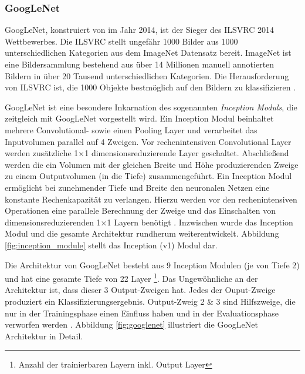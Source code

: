 \subsubsection{GoogLeNet}
\label{sec:googlenet}
GoogLeNet, konstruiert von \citet{szegedyGoingDeeperConvolutions2015} im Jahr 2014, ist der Sieger des ILSVRC 2014 Wettbewerbes. Die ILSVRC stellt ungefähr 1000 Bilder aus 1000 unterschiedlichen Kategorien aus dem ImageNet Datensatz bereit. ImageNet ist eine Bildersammlung bestehend aus über 14 Millionen manuell annotierten Bildern in über 20 Tausend unterschiedlichen Kategorien. Die Herausforderung von ILSVRC ist, die 1000 Objekte bestmöglich auf den Bildern zu klassifizieren \cite{russakovskyImageNetLargeScale2015}.

GoogLeNet ist eine besondere Inkarnation des sogenannten \textit{Inception Moduls}, die zeitgleich mit GoogLeNet vorgestellt wird.
Ein Inception Modul beinhaltet mehrere Convolutional- sowie einen Pooling Layer und verarbeitet das Inputvolumen parallel auf 4 Zweigen. Vor rechenintensiven Convolutional Layer werden zusätzliche 1$\times$1 dimensionsreduzierende Layer geschaltet. Abschließend werden die ein Volumen mit der gleichen Breite und Höhe produzierenden Zweige zu einem Outputvolumen (in die Tiefe) zusammengeführt. Ein Inception Modul ermöglicht bei zunehmender Tiefe und Breite den neuronalen Netzen eine konstante Rechenkapazität zu verlangen. Hierzu werden vor den rechenintensiven Operationen eine parallele Berechnung der Zweige und das Einschalten von dimensionsreduzierenden 1$\times$1 Layern benötigt \cite{szegedyGoingDeeperConvolutions2015}. Inzwischen wurde das Inception Modul \cite{szegedyRethinkingInceptionArchitecture2016} und die gesamte Architektur rundherum \cite{szegedyInceptionv4InceptionResNetImpact2016} weiterentwickelt. Abbildung \ref{fig:inception_module} stellt das Inception (v1) Modul dar.

Die Architektur von GoogLeNet besteht aus 9 Inception Modulen (je von Tiefe 2) und hat eine gesamte Tiefe von 22 Layer \footnote{Anzahl der trainierbaren Layern inkl. Output Layer}. Das Ungewöhnliche an der Architektur ist, dass dieser 3 Output-Zweigen hat. Jedes der Ouput-Zweige produziert ein Klassifizierungsergebnis. Output-Zweig 2 \& 3 sind Hilfszweige, die nur in der Trainingsphase einen Einfluss haben und in der Evaluationsphase verworfen werden \cite{szegedyGoingDeeperConvolutions2015}. Abbildung \ref{fig:googlenet} illustriert die GoogLeNet Architektur in Detail.

